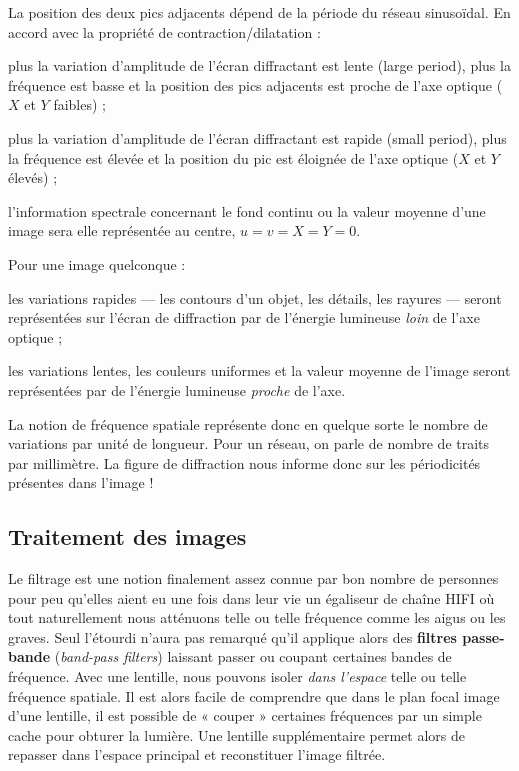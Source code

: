 La position des deux pics adjacents dépend de la période du réseau sinusoïdal.
En accord avec la propriété de contraction/dilatation :
\begin{subpart}
  \item plus la variation d'amplitude de l'écran diffractant est lente (large
    period), plus la fréquence est basse et la position des pics adjacents est
    proche de l'axe optique ($X$ et $Y$ faibles) ;
  \item plus la variation d'amplitude de l'écran diffractant est rapide (small
    period), plus la fréquence est élevée et la position du pic est éloignée de
    l'axe optique ($X$ et $Y$ élevés) ;
  \item l'information spectrale concernant le fond continu ou la valeur moyenne
    d'une image sera elle représentée au centre, $u = v = X = Y = 0$.
\end{subpart}

\begin{conclusion}
  Pour une image quelconque :
  \begin{subpart}
    \item les variations rapides --- les contours d'un objet, les détails, les
      rayures --- seront représentées sur l'écran de diffraction par de
      l'énergie lumineuse \emph{loin} de l'axe optique ;
    \item les variations lentes, les couleurs uniformes et la valeur moyenne de
      l'image seront représentées par de l'énergie lumineuse \emph{proche} de
      l'axe.
  \end{subpart}
  La notion de fréquence spatiale représente donc en quelque sorte le nombre de
  variations par unité de longueur. Pour un réseau, on parle de nombre de traits
  par millimètre. La figure de diffraction nous informe donc sur les
  périodicités présentes dans l'image !
\end{conclusion}

\subsection{Traitement des images}
Le filtrage est une notion finalement assez connue par bon nombre de personnes
pour peu qu'elles aient eu une fois dans leur vie un égaliseur de chaîne HIFI où
tout naturellement nous atténuons telle ou telle fréquence comme les aigus ou
les graves. Seul l'étourdi n'aura pas remarqué qu'il applique alors des
\textbf{filtres passe-bande} (\textit{band-pass filters}) laissant passer ou
coupant certaines bandes de fréquence. Avec une
lentille, nous pouvons isoler \emph{dans l'espace} telle ou telle fréquence
spatiale. Il est alors facile de comprendre que dans le plan focal image d'une
lentille, il est possible de « couper » certaines fréquences par un simple cache
pour obturer la lumière. Une lentille supplémentaire permet alors de repasser
dans l'espace principal et reconstituer l'image filtrée.

